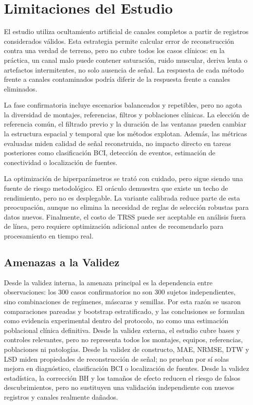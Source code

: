 \section{Limitaciones del Estudio}

El estudio utiliza ocultamiento artificial de canales completos a partir de registros considerados válidos. Esta estrategia permite calcular error de reconstrucción contra una verdad de terreno, pero no cubre todos los casos clínicos: en la práctica, un canal malo puede contener saturación, ruido muscular, deriva lenta o artefactos intermitentes, no solo ausencia de señal. La respuesta de cada método frente a canales contaminados podría diferir de la respuesta frente a canales eliminados.

La fase confirmatoria incluye escenarios balanceados y repetibles, pero no agota la diversidad de montajes, referencias, filtros y poblaciones clínicas. La elección de referencia común, el filtrado previo y la duración de las ventanas pueden cambiar la estructura espacial y temporal que los métodos explotan. Además, las métricas evaluadas miden calidad de señal reconstruida, no impacto directo en tareas posteriores como clasificación BCI, detección de eventos, estimación de conectividad o localización de fuentes.

La optimización de hiperparámetros se trató con cuidado, pero sigue siendo una fuente de riesgo metodológico. El oráculo demuestra que existe un techo de rendimiento, pero no es desplegable. La variante calibrada reduce parte de esta preocupación, aunque no elimina la necesidad de reglas de selección robustas para datos nuevos. Finalmente, el costo de TRSS puede ser aceptable en análisis fuera de línea, pero requiere optimización adicional antes de recomendarlo para procesamiento en tiempo real.

\subsection{Amenazas a la Validez}

Desde la validez interna, la amenaza principal es la dependencia entre observaciones: los 300 casos confirmatorios no son 300 sujetos independientes, sino combinaciones de regímenes, máscaras y semillas. Por esta razón se usaron comparaciones pareadas y bootstrap estratificado, y las conclusiones se formulan como evidencia experimental dentro del protocolo, no como una estimación poblacional clínica definitiva. Desde la validez externa, el estudio cubre bases y controles relevantes, pero no representa todos los montajes, equipos, referencias, poblaciones ni patologías. Desde la validez de constructo, MAE, NRMSE, DTW y LSD miden propiedades de reconstrucción de señal; no prueban por sí solas mejora en diagnóstico, clasificación BCI o localización de fuentes. Desde la validez estadística, la corrección BH y los tamaños de efecto reducen el riesgo de falsos descubrimientos, pero no sustituyen una validación independiente con nuevos registros y canales realmente dañados.

